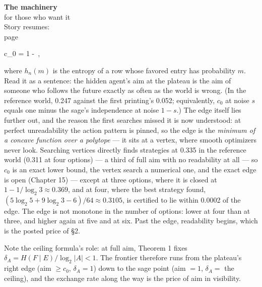 \begin{machinery}{\textbf{The machinery}\\for those who want it\\[3pt]{\color{muted}Story resumes:\\page~\pageref{ch7}}}
\begin{dispmath}c_0 = 1 - \,,\end{dispmath}

\noindent where \(h_n(m)\) is the entropy of a row whose favored entry has probability \(m\). Read it as a sentence: the hidden agent's aim at the plateau is the
aim of someone who follows the future exactly as often as the world is
wrong. (In the reference world, 0.247 against the first printing's
0.052; equivalently, \(c_0\) at noise \(s\) equals one minus the sage's independence at noise \(1-s\).) The edge itself lies further out, and
the reason the first searches missed it is now understood: at perfect
unreadability the action pattern is pinned, so the edge is the
\emph{minimum of a concave function over a polytope} --- it sits at a vertex,
where smooth optimizers never look. Searching vertices directly finds
strategies at 0.335 in the reference world (0.311 at four options) ---
a third of full aim with no readability at all --- so \(c_0\) is an exact
lower bound, the vertex search a numerical one, and the exact edge is
open (Chapter 15) --- except at three options, where it is closed at
\(1 - 1/\log_2 3 \approx 0.369\), and at four, where the best strategy found, \((5\log_2 5 + 9\log_2 3 - 6)/64 \approx 0.3105\), is certified to lie within 0.0002
of the edge. The edge is not monotone in the number of options: lower
at four than at three, and higher again at five and at six. Past the edge,
readability begins, which is the
posted price of §2.

Note the ceiling formula's role: at full aim, Theorem 1 fixes
\(\delta_A \allowbreak = H(F \mid E)/\log_2 |A| < 1\). The frontier therefore runs from the plateau's right edge (aim \(\ge c_0\), \(\delta_A = 1\)) down to the sage point (aim \(= 1\), \(\delta_A =\) the ceiling), and the exchange rate along the way is the price of
aim in visibility.



\end{machinery}
